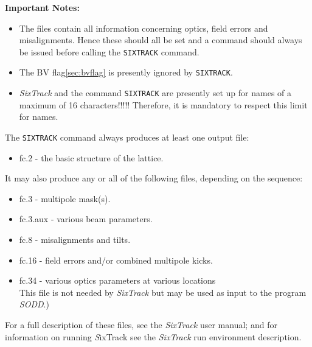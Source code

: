 {\bf Important Notes:}
\begin{itemize} 
\item The files contain all information concerning optics, field errors
 and misalignments. Hence these should all be set and a   
command should always be issued before calling the \texttt{SIXTRACK} command.

\item The BV flag\ref{sec:bvflag} is presently ignored by \texttt{SIXTRACK}.

\item \textit{SixTrack} and the \madx command \texttt{SIXTRACK} are
  presently set up for names of a maximum of 16 characters!!!!! 
  Therefore, it is mandatory to respect this limit for \madx names.
\end{itemize}



The \texttt{SIXTRACK} command always produces at least one output file: 
\begin{itemize}
   \item  fc.2 -  the basic structure of the lattice. 
\end{itemize} 
It may also produce any or all of the following files, depending on the
sequence:
\begin{itemize}
   \item  fc.3 -   multipole mask(s). 
   \item  fc.3.aux -  various beam parameters. 
   \item  fc.8 -   misalignments and tilts. 
   \item  fc.16 -  field errors and/or combined multipole kicks. 
   \item  fc.34 -  various optics parameters at various
     locations \\ This file is not needed by \textit{SixTrack} but may
     be used as input to the program \textit{SODD}\cite{SODD}.)   
\end{itemize}  

For a full description of these files, see the \textit{SixTrack} user
manual\cite{SixTrack}; and for information on running {\textit SixTrack} 
see the \textit{SixTrack} run environment description\cite{SixTrack_RE}.

